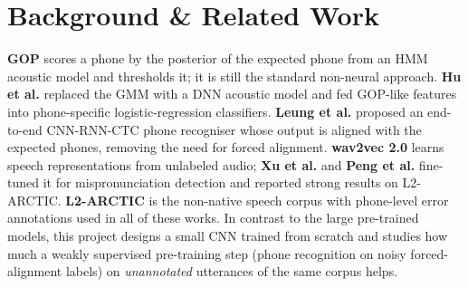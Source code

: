 \documentclass[final]{article}
\begin{document}
\section*{Background \& Related Work}
\textbf{GOP} \cite{witt2000phone} scores a phone by the posterior of the expected phone from an HMM acoustic
model and thresholds it; it is still the standard non-neural approach. \textbf{Hu et al.} \cite{hu2015improved}
replaced the GMM with a DNN acoustic model and fed GOP-like features into phone-specific logistic-regression
classifiers. \textbf{Leung et al.} \cite{leung2019cnn} proposed an end-to-end CNN-RNN-CTC phone recogniser
whose output is aligned with the expected phones, removing the need for forced alignment. \textbf{wav2vec 2.0}
\cite{baevski2020wav2vec} learns speech representations from unlabeled audio; \textbf{Xu et al.} \cite{xu2021explore}
and \textbf{Peng et al.} \cite{peng2021study} fine-tuned it for mispronunciation detection and reported strong
results on L2-ARCTIC. \textbf{L2-ARCTIC} \cite{zhao2018l2arctic} is the non-native speech corpus with phone-level
error annotations used in all of these works. In contrast to the large pre-trained models, this project designs a
small CNN trained from scratch and studies how much a weakly supervised pre-training step (phone recognition on noisy forced-alignment labels) on
\emph{unannotated} utterances of the same corpus helps.
\end{document}
